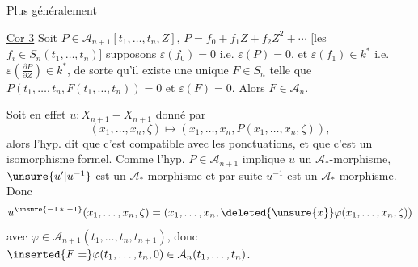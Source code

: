 Plus généralement

\uline{Cor 3} Soit $P\in \mathcal A_{n+1}[t_1,\ldots,t_n,Z]$, $P=f_0+f_1Z+f_2Z^2+\cdots$ [les $f_i\in S_n(t_1,\ldots,t_n)$] supposons $\varepsilon(f_0)=0$ i.e. $\varepsilon(P)=0$, et $\varepsilon(f_1)\in k^*$ i.e. $\varepsilon\left(\frac{\partial P}{\partial Z}\right)\in k^*$, de sorte qu'il existe une unique $F\in S_n$ telle que $P(t_1,\ldots,t_n,F(t_1,\ldots,t_n))=0$ et $\varepsilon(F)=0$. Alors $F\in \mathcal A_n$.

Soit en effet $u:X_{n+1}\mathbin{-}X_{n+1}$ donné par
\[
(x_1,\ldots,x_n,\zeta)\longmapsto(x_1,\ldots,x_n,P(x_1,\ldots,x_n,\zeta)),
\]
alors l'hyp. dit que c'est compatible avec les ponctuations, et que c'est un isomorphisme formel. Comme l'hyp. $P\in \mathcal A_{n+1}$ implique $u$ un $\mathcal A_*$-morphisme, $\unsure{u'|u^{-1}}$ est un $\mathcal A_*$ morphisme et par suite $u^{-1}$ est un $\mathcal A_*$-morphisme. Donc
\[
u^{\unsure{-1\,*|-1}}(x_1,\ldots,x_n,\zeta)=(x_1,\ldots,x_n,\deleted{\unsure{x}}\varphi(x_1,\ldots,x_n,\zeta))
\]
avec $\varphi\in \mathcal A_{n+1}(t_1,\ldots,t_n,t_{n+1})$, donc $\inserted{F=}\varphi(t_1,\ldots,t_n,0)\in \mathcal A_n(t_1,\ldots,t_n)$.


